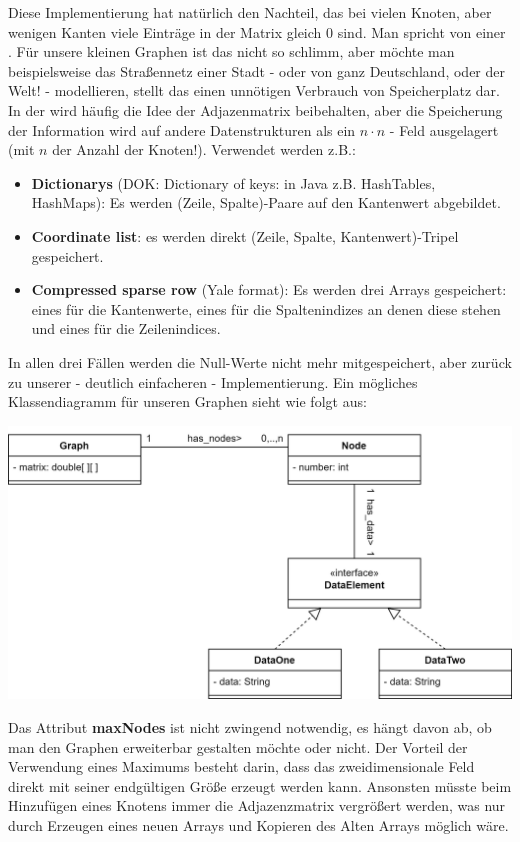 \documentclass{article}
\begin{document}
Diese Implementierung hat natürlich den Nachteil, das bei vielen Knoten, aber wenigen Kanten viele Einträge in der Matrix gleich $0$ sind. Man spricht von einer . Für unsere kleinen Graphen ist das nicht so schlimm, aber möchte man beispielsweise das Straßennetz einer Stadt - oder von ganz Deutschland, oder der Welt! - modellieren, stellt das einen unnötigen Verbrauch von Speicherplatz dar. In der  wird häufig die Idee der Adjazenmatrix beibehalten, aber die Speicherung der Information wird auf andere Datenstrukturen als ein $n\cdot n$ - Feld ausgelagert (mit $n$ der Anzahl der Knoten!). Verwendet werden z.B.:
\begin{itemize}
    \item \textbf{Dictionarys} (DOK: Dictionary of keys: in Java z.B. HashTables, HashMaps): Es werden (Zeile, Spalte)-Paare auf den Kantenwert abgebildet.
    \item \textbf{Coordinate list}: es werden direkt (Zeile, Spalte, Kantenwert)-Tripel gespeichert. 
    \item \textbf{Compressed sparse row} (Yale format): Es werden drei Arrays gespeichert: eines für die Kantenwerte, eines für die Spaltenindizes an denen diese stehen und eines für die Zeilenindices.
\end{itemize}
In allen drei Fällen werden die Null-Werte nicht mehr mitgespeichert, aber zurück zu unserer - deutlich einfacheren - Implementierung. Ein mögliches Klassendiagramm für unseren Graphen sieht wie folgt aus: 
\begin{center}
    \includegraphics[scale=0.2]{../../media/graph_advanced.png}
\end{center}
Das Attribut \textbf{maxNodes} ist nicht zwingend notwendig, es hängt davon ab, ob man den Graphen erweiterbar gestalten möchte oder nicht. Der Vorteil der Verwendung eines Maximums besteht darin, dass das zweidimensionale Feld direkt mit seiner endgültigen Größe erzeugt werden kann. Ansonsten müsste beim Hinzufügen eines Knotens immer die Adjazenzmatrix vergrößert werden, was nur durch Erzeugen eines neuen Arrays und Kopieren des Alten Arrays möglich wäre. \\
\end{document}
